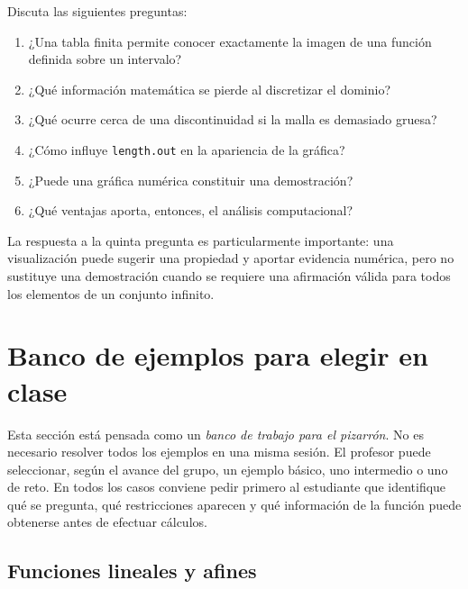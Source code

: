 \documentclass[12pt]{article}
\theoremstyle{remark}
\begin{document}
Discuta las siguientes preguntas:

\begin{enumerate}
    \item ¿Una tabla finita permite conocer exactamente la imagen de una
    función definida sobre un intervalo?
    \item ¿Qué información matemática se pierde al discretizar el dominio?
    \item ¿Qué ocurre cerca de una discontinuidad si la malla es demasiado
    gruesa?
    \item ¿Cómo influye \texttt{length.out} en la apariencia de la gráfica?
    \item ¿Puede una gráfica numérica constituir una demostración?
    \item ¿Qué ventajas aporta, entonces, el análisis computacional?
\end{enumerate}

La respuesta a la quinta pregunta es particularmente importante: una
visualización puede sugerir una propiedad y aportar evidencia numérica, pero
no sustituye una demostración cuando se requiere una afirmación válida para
todos los elementos de un conjunto infinito.


\section{Banco de ejemplos para elegir en clase}
\label{sec:banco-ejemplos}

Esta sección está pensada como un \emph{banco de trabajo para el pizarrón}. No es necesario resolver todos los ejemplos en una misma sesión. El profesor puede seleccionar, según el avance del grupo, un ejemplo básico, uno intermedio o uno de reto. En todos los casos conviene pedir primero al estudiante que identifique qué se pregunta, qué restricciones aparecen y qué información de la función puede obtenerse antes de efectuar cálculos.

\subsection{Funciones lineales y afines}
\end{document}
